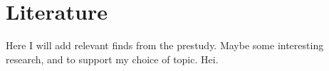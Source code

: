 \section{Literature}
Here I will add relevant finds from the prestudy. Maybe some interesting research, and to support my choice of topic. Hei. 